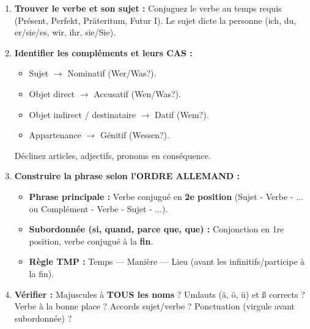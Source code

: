 \documentclass[11pt]{article}
\newcommand{\cle}[1]{{\popxbold\color{popdark}#1}}
\begin{document}
\begin{methode}
\begin{enumerate}
    \item \textbf{Trouver le verbe et son sujet :} Conjuguez le verbe au temps requis (Présent, Perfekt, Präteritum, Futur I). Le sujet dicte la personne (ich, du, er/sie/es, wir, ihr, sie/Sie).
    \item \textbf{Identifier les compléments et leurs CAS :} 
    \begin{itemize}
        \item Sujet $\to$ \cle{Nominatif} (Wer/Was?).
        \item Objet direct $\to$ \cle{Accusatif} (Wen/Was?).
        \item Objet indirect / destinataire $\to$ \cle{Datif} (Wem?).
        \item Appartenance $\to$ \cle{Génitif} (Wessen?).
    \end{itemize}
    Déclinez articles, adjectifs, pronoms en conséquence.
    \item \textbf{Construire la phrase selon l'ORDRE ALLEMAND :}
    \begin{itemize}
        \item \textbf{Phrase principale :} Verbe conjugué en \textbf{2e position} (Sujet - Verbe - ... ou Complément - Verbe - Sujet - ...).
        \item \textbf{Subordonnée (si, quand, parce que, que) :} Conjonction en 1re position, verbe conjugué à la \textbf{fin}.
        \item \textbf{Règle TMP :} Temps — Manière — Lieu (avant les infinitifs/participe à la fin).
    \end{itemize}
    \item \textbf{Vérifier :} Majuscules à \textbf{TOUS les noms} ? Umlauts (ä, ö, ü) et ß corrects ? Verbe à la bonne place ? Accords sujet/verbe ? Ponctuation (virgule avant subordonnée) ?
\end{enumerate}
\end{methode}
\end{document}
